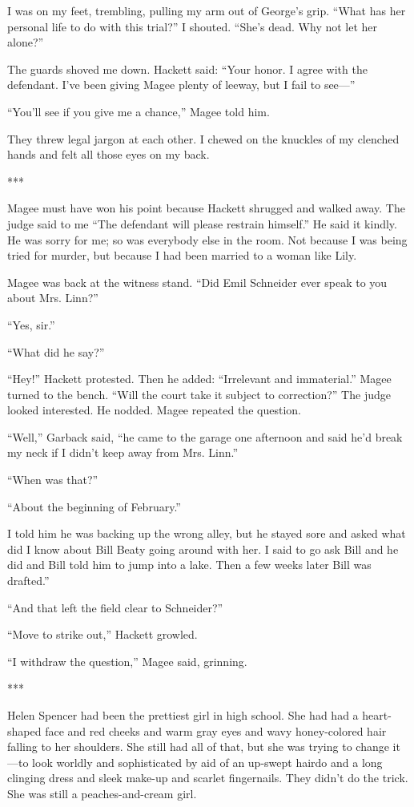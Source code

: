 \documentclass{novel}
\begin{document}
I was on my feet, trembling, pulling my arm out of George’s grip. “What has her personal life to do with this trial?” I shouted. “She’s dead. Why not let her alone?”

The guards shoved me down. Hackett said: “Your honor. I agree with the defendant. I’ve been giving Magee plenty of leeway, but I fail to see—”

“You’ll see if you give me a chance,” Magee told him.

They threw legal jargon at each other. I chewed on the knuckles of my clenched hands and felt all those eyes on my back.

***

Magee must have won his point because Hackett shrugged and walked away. The judge said to me “The defendant will please restrain himself.” He said it kindly. He was sorry for me; so was everybody else in the room. Not because I was being tried for murder, but because I had been married to a woman like Lily.

Magee was back at the witness stand. “Did Emil Schneider ever speak to you about Mrs. Linn?”

“Yes, sir.”

“What did he say?”

“Hey!” Hackett protested. Then he added: “Irrelevant and immaterial.” Magee turned to the bench. “Will the court take it subject to correction?” The judge looked interested. He nodded. Magee repeated the question.

“Well,” Garback said, “he came to the garage one afternoon and said he’d break my neck if I didn’t keep away from Mrs. Linn.”

“When was that?”

“About the beginning of February.”

I told him he was backing up the wrong alley, but he stayed sore and asked what did I know about Bill Beaty going around with her. I said to go ask Bill and he did and Bill told him to jump into a lake. Then a few weeks later Bill was drafted.”

“And that left the field clear to Schneider?”

“Move to strike out,” Hackett growled.

“I withdraw the question,” Magee said, grinning.

***

Helen Spencer had been the prettiest girl in high school. She had had a heart-shaped face and red cheeks and warm gray eyes and wavy honey-colored hair falling to her shoulders. She still had all of that, but she was trying to change it—to look worldly and sophisticated by aid of an up-swept hairdo and a long clinging dress and sleek make-up and scarlet fingernails. They didn’t do the trick. She was still a peaches-and-cream girl.
\end{document}
